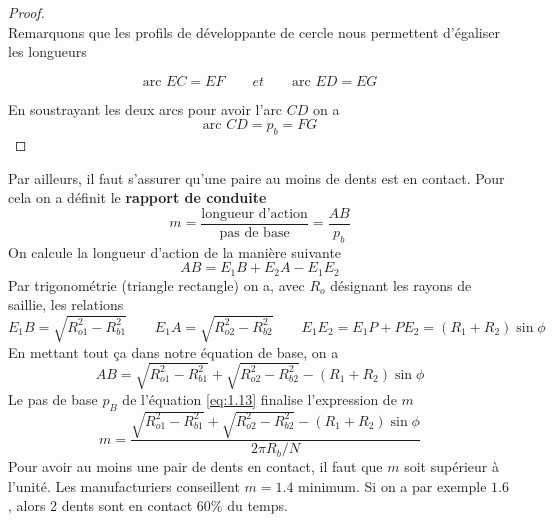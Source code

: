 \begin{proof} \ \\
	Remarquons que les profils de développante de cercle nous permettent d'égaliser les longueurs 
	
	\begin{equation}
		\mbox{arc } EC = EF \qquad et \qquad \mbox{arc } ED = EG
	\end{equation}				
			
	En soustrayant les deux arcs pour avoir l'arc $CD$ on a 
	\begin{equation}
		\mbox{arc } CD = p_b = FG
	\end{equation}				
\end{proof}
	
Par ailleurs, il faut s'assurer qu'une paire au moins de dents est en contact. Pour cela on a définit le \textbf{rapport de conduite}
\begin{equation}
	m = \frac{\mbox{longueur d'action}}{\mbox{pas de base}} = \frac{AB}{p_b}
\end{equation}
On calcule la longueur d'action de la manière suivante
\begin{equation}
	AB = E_1B + E_2A -E_1E_2
\end{equation}
Par trigonométrie (triangle rectangle) on a, avec $R_o$ désignant les rayons de saillie, les relations
\begin{equation}
	E_1B = \sqrt{R_{o1}^2-R_{b1}^2} \qquad E_1A = \sqrt{R_{o2}^2-R_{b2}^2} \qquad E_1E_2 = E_1P + PE_2 = (R_1 + R_2) \sin \phi
\end{equation}
En mettant tout ça dans notre équation de base, on a
\begin{equation}
	AB = \sqrt{R_{o1}^2-R_{b1}^2} + \sqrt{R_{o2}^2-R_{b2}^2} - (R_1 + R_2) \sin \phi
\end{equation}
Le pas de base $p_B$ de l'équation \autoref{eq:1.13} finalise l'expression de $m$
\begin{equation}
	m = \frac{\sqrt{R_{o1}^2-R_{b1}^2} + \sqrt{R_{o2}^2-R_{b2}^2} - (R_1 + R_2) \sin \phi}{2\pi R_b/N}
\end{equation}
Pour avoir au moins une pair de dents en contact, il faut que $m$ soit supérieur à l'unité. Les manufacturiers conseillent $m = 1.4$ minimum. Si on a par exemple $1.6$, alors 2 dents sont en contact $60 \%$ du temps.
		
